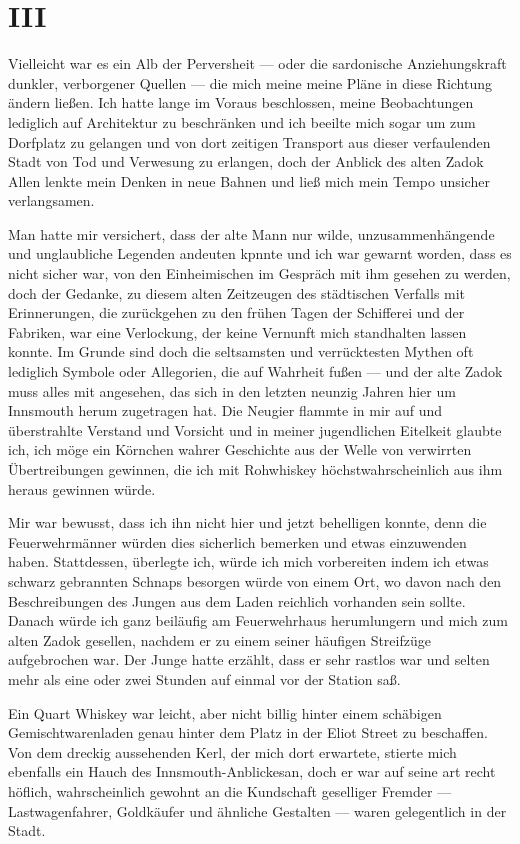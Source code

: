 \chapter*{III}

Vielleicht war es ein Alb der Perversheit --- oder die sardonische Anziehungskraft dunkler, verborgener Quellen --- die mich meine meine Pläne in diese Richtung ändern ließen. Ich hatte lange im Voraus beschlossen, meine Beobachtungen lediglich auf Architektur zu beschränken und ich beeilte mich sogar um zum Dorfplatz zu gelangen und von dort zeitigen Transport aus dieser verfaulenden Stadt von Tod und Verwesung zu erlangen, doch der Anblick des alten Zadok Allen lenkte mein Denken in neue Bahnen und ließ mich mein Tempo unsicher verlangsamen.

Man hatte mir versichert, dass der alte Mann nur wilde, unzusammenhängende und unglaubliche Legenden andeuten kpnnte und ich war gewarnt worden, dass es nicht sicher war, von den Einheimischen im Gespräch mit ihm gesehen zu werden, doch der Gedanke, zu diesem alten Zeitzeugen des städtischen Verfalls mit Erinnerungen, die zurückgehen zu den frühen Tagen der Schifferei und der Fabriken, war eine Verlockung, der keine Vernunft mich standhalten lassen konnte. Im Grunde sind doch die seltsamsten und verrücktesten Mythen oft lediglich Symbole oder Allegorien, die auf Wahrheit fußen --- und der alte Zadok muss alles mit angesehen, das sich in den letzten neunzig Jahren hier um Innsmouth herum zugetragen hat. Die Neugier flammte in mir auf und überstrahlte Verstand und Vorsicht und in meiner jugendlichen Eitelkeit glaubte ich, ich möge ein Körnchen wahrer Geschichte aus der Welle von verwirrten Übertreibungen gewinnen, die ich mit Rohwhiskey höchstwahrscheinlich aus ihm heraus gewinnen würde.

Mir war bewusst, dass ich ihn nicht hier und jetzt behelligen konnte, denn die Feuerwehrmänner würden dies sicherlich bemerken und etwas einzuwenden haben. Stattdessen, überlegte ich, würde ich mich vorbereiten indem ich etwas schwarz gebrannten Schnaps besorgen würde von einem Ort, wo davon nach den Beschreibungen des Jungen aus dem Laden reichlich vorhanden sein sollte. Danach würde ich ganz beiläufig am Feuerwehrhaus herumlungern und mich zum alten Zadok gesellen, nachdem er zu einem seiner häufigen Streifzüge aufgebrochen war. Der Junge hatte erzählt, dass er sehr rastlos war und selten mehr als eine oder zwei Stunden auf einmal vor der Station saß.

Ein Quart Whiskey war leicht, aber nicht billig hinter einem schäbigen Gemischtwarenladen genau hinter dem Platz in der Eliot Street zu beschaffen. Von dem dreckig aussehenden Kerl, der mich dort erwartete, stierte mich ebenfalls ein Hauch des \glqq Innsmouth-Anblickes\grqq an, doch er war auf seine art recht höflich, wahrscheinlich gewohnt an die Kundschaft geselliger Fremder --- Lastwagenfahrer, Goldkäufer und ähnliche Gestalten --- waren gelegentlich in der Stadt.

